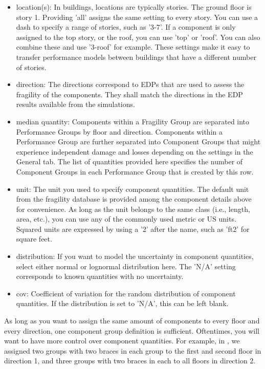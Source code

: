 \begin{itemize}
	\item location(s): In buildings, locations are typically stories. The ground floor is story 1. Providing 'all' assigns the same setting to every story. You can use a dash to specify a range of stories, such as '3-7'. If a component is only assigned to the top story, or the roof, you can use 'top' or 'roof'. You can also combine these and use '3-roof' for example. These settings make it easy to transfer performance models between buildings that have a different number of stories.
	\item direction: The directions correspond to EDPs that are used to assess the fragility of the components. They shall match the directions in the EDP results available from the simulations.
	\item median quantity: Components within a Fragility Group are separated into Performance Groups by floor and direction. Components within a Performance Group are further separated into Component Groups that might experience independent damage and losses depending on the settings in the General tab. The list of quantities provided here specifies the number of Component Groups in each Performance Group that is created by this row.
	\item unit: The unit you used to specify component quantities. The default unit from the fragility database is provided among the component details above for convenience. As long as the unit belongs to the same class (i.e., length, area, etc.), you can use any of the commonly used metric or US units. Squared units are expressed by using a '2' after the name, such as 'ft2' for square feet.
	\item distribution: If you want to model the uncertainty in component quantities, select either normal or lognormal distribution here. The 'N/A' setting corresponds to known quantities with no uncertainty.
	\item cov: Coefficient of variation for the random distribution of component quantities. If the distribution is set to 'N/A', this can be left blank.
\end{itemize}

As long as you want to assign the same amount of components to every floor and every direction, one component group definition is sufficient. Oftentimes, you will want to have more control over component quantities. For example, in , we assigned two groups with two braces in each group to the first and second floor in direction 1, and three groups with two braces in each to all floors in direction 2.

